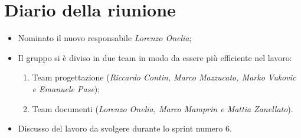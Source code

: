 \section{Diario della riunione}
\begin{itemize}
  \item Nominato il nuovo responsabile \textit{Lorenzo Onelia};
  \item Il gruppo si è diviso in due team in modo da essere più efficiente nel lavoro:
    \begin{enumerate}
      \item Team progettazione (\textit{Riccardo Contin, Marco Mazzucato, Marko Vukovic e Emanuele Pase});
      \item Team documenti (\textit{Lorenzo Onelia, Marco Mamprin e Mattia Zanellato}).
    \end{enumerate}
  \item Discusso del lavoro da svolgere durante lo sprint numero 6.
\end{itemize}
